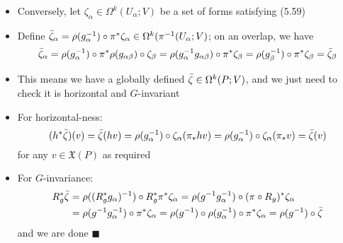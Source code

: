 \documentclass[12pt,a4paper]{article}
\numberwithin{equation}{section}
\begin{document}
\begin{itemize}
\begin{itemize}
			\item Conversely, let $\zeta_{\alpha}\in\Omega^{k}(U_{\alpha};V)$ be a set of forms satisfying (5.59)
			\item Define $\bar{\zeta}_{\alpha}=\rho(g^{-1}_{\alpha})\circ\pi^{*}\zeta_{\alpha}\in\Omega^{k}(\pi^{-1}(U_{\alpha};V)$; on an overlap, we have
			$$
			\bar{\zeta}_{\alpha}=\rho(g_{\alpha}^{-1})\circ\pi^{*}\rho(g_{\alpha\beta})\circ\zeta_{\beta}=\rho(g^{-1}_{\alpha}g_{\alpha\beta})\circ\pi^{*}\zeta_{\beta}=\rho(g_{\beta}^{-1})\circ\pi^{*}\zeta_{\beta}=\bar{\zeta}_{\beta}
			$$
			\item This means we have a globally defined $\bar{\zeta}\in\Omega^{k}(P;V)$, and we just need to check it is horizontal and $G$-invariant
			\item For horizontal-ness:
			$$
			(h^{*}\bar{\zeta})(v)=\bar{\zeta}(hv)=\rho(g_{\alpha}^{-1})\circ\zeta_{\alpha}(\pi_{*}hv)=\rho(g_{\alpha}^{-1})\circ\zeta_{\alpha}(\pi_{*}v)=\bar{\zeta}(v)
			$$
			for any $v\in\mathfrak{X}(P)$ as required
			\item For $G$-invariance:
			$$
			\begin{aligned}
				R_{g}^{*}\bar{\zeta}&=\rho((R_{g}^{*}g_{\alpha})^{-1})\circ R_{g}^{*}\pi^{*}\zeta_{\alpha}=\rho(g^{-1}g_{\alpha}^{-1})\circ(\pi\circ R_{g})^{*}\zeta_{\alpha}\\&=\rho(g^{-1}g_{\alpha}^{-1})\circ\pi^{*}\zeta_{\alpha}=\rho(g^{-1})\circ\rho(g_{\alpha}^{-1})\circ\pi^{*}\zeta_{\alpha}=\rho(g^{-1})\circ\bar{\zeta}
			\end{aligned}
			$$
			and we are done $\blacksquare$
		\end{itemize}
	\end{itemize}
\end{document}

